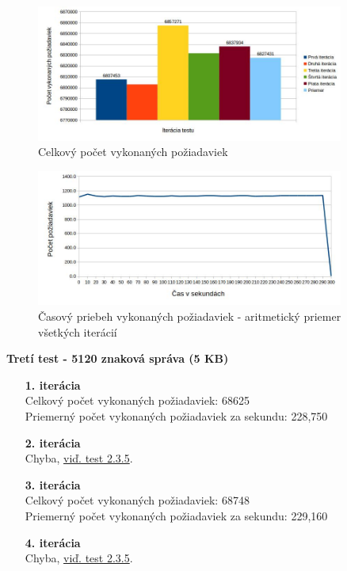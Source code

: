 \documentclass[12pt,oneside,final]{fithesis-utf8}
\begin{document}
\begin{itemize}
\begin{figure}[H]
  \centering
      \includegraphics[width=0.9\textwidth]{faban3_2.jpg}
  \caption{Celkový počet vykonaných požiadaviek}
\end{figure}

\begin{figure}[H]
  \centering
      \includegraphics[width=0.9\textwidth]{faban3_2_distr.jpg}
  \caption{Časový priebeh vykonaných požiadaviek - aritmetický priemer všetkých iterácií}
\end{figure}

\textbf{Tretí test - 5120 znaková správa (5 KB)}
\begin{itemize}

\item[\textbf{1. iterácia}]\ \\
Celkový počet vykonaných požiadaviek: 68625\\
Priemerný počet vykonaných požiadaviek za sekundu: 228,750

\item[\textbf{2. iterácia}]\ \\
Chyba, \hyperlink{label}{viď. test 2.3.5}.

\item[\textbf{3. iterácia}]\ \\
Celkový počet vykonaných požiadaviek: 68748\\
Priemerný počet vykonaných požiadaviek za sekundu: 229,160

\item[\textbf{4. iterácia}]\ \\
Chyba, \hyperlink{label}{viď. test 2.3.5}.


\end{itemize}
\end{itemize}
\end{document}
